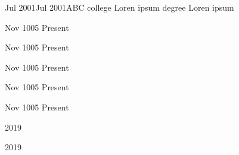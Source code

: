 
\usepackage{blindtext}  
\usepackage{lipsum}

\def\lrand{\lipsum[-]}
\def\firstname{Grigor}
\def\lastname{Pahlevanyan}
\def\email{pahlevag@mcmaster.ca}
\def\linkedin{https://www.linkedin.com/in/grigorpahlevanyan/}
\def\github{https://github.com/Grigor-Pahlevanyan}
\def\jasphone{+1 (647) 450-8086}

\def\jbegin{\resumeItemListStart}
\def\jitem{\resumeItem}
\def\jend{\resumeItemListEnd}

\def\profileSummary{
\section{Career summary so far}
\blindtext
}


\def\achievements{
    \jbegin
        \jitem{\lrand[1]}
        \jitem {\lrand[2]}
        \jitem {\lrand[1]}
        \jitem {\lrand[2]}
    \jend
}

{Jul 2001}{Jul 2001}{ABC college }
{Loren ipsum degree}
{Loren ipsum}

{Nov 1005}
{Present}
{\lrand[1]}
{\lrand[1]}
{\lrand[1]}
{
\jbegin
    \jitem{\lrand[2]}
    \jitem{\lrand[1]}
    \jitem{\lrand[3]}
    \jitem{\lrand[5]}
\jend
}


{Nov 1005}
{Present}
{\lrand[1]}
{\lrand[1]}
{\lrand[1]}
{
\jbegin
    \jitem{\lrand[2]}
    \jitem{\lrand[1]}
    \jitem{\lrand[7]}
\jend
}


{Nov 1005}
{Present}
{\lrand[1]}
{\lrand[1]}
{\lrand[1]}
{
\jbegin
    \jitem{\lrand[2]}
    \jitem{\lrand[1]}
    \jitem{\lrand[7]}
\jend
}

{Nov 1005}
{Present}
{\lrand[1]}
{\lrand[1]}
{\lrand[1]}
{
\jbegin
    \jitem{\lrand[2]}
    \jitem{\lrand[1]}
    \jitem{\lrand[7]}
\jend
}

{Nov 1005}
{Present}
{\lrand[1]}
{\lrand[1]}
{\lrand[1]}
{
\jbegin
    \jitem{\lrand[2]}
    \jitem{\lrand[1]}
    \jitem{\lrand[7]}
\jend
}


{2019}
{\lrand[1]}
{\lrand[3]}
{\jbegin
    \jitem{\lrand[27]}
    \jitem{ \lrand[28]}
\jend}


{2019}
{\lrand[1]}
{\lrand[3]}
{\jbegin
    \jitem{\lrand[27]}
    \jitem{ \lrand[28]}
    \jitem{ \lrand[30]}
\jend}

